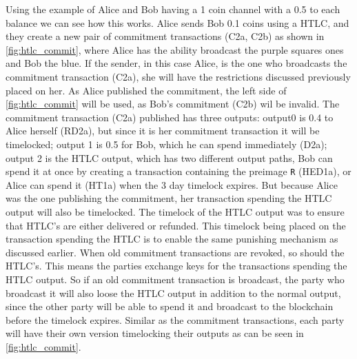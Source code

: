 Using the example of Alice and Bob having a 1 coin channel with a 0.5 to each balance we can see how this works. Alice sends Bob 0.1 coins using a HTLC, and they create a new pair of commitment transactions (C2a, C2b) as shown in \cref{fig:htlc_commit}, where Alice has the ability broadcast the purple squares ones and Bob the blue.
If the sender, in this case Alice, is the one who broadcasts the commitment transaction (C2a), she will have the restrictions discussed previously placed on her.
As Alice published the commitment, the left side of \cref{fig:htlc_commit} will be used, as Bob's commitment (C2b) wil be invalid. The commitment transaction (C2a) published has three outputs: output0 is 0.4 to Alice herself (RD2a), but since it is her commitment transaction it will be timelocked; output 1 is 0.5 for Bob, which he can spend immediately (D2a); output 2 is the HTLC output, which has two different output paths, Bob can spend it at once by creating a transaction containing the preimage {\tt R} (HED1a), or Alice can spend it (HT1a) when the 3 day timelock expires. But because Alice was the one publishing the commitment, her transaction spending the HTLC output will also be timelocked. The timelock of the HTLC output was to ensure that HTLC's are either delivered or refunded. This timelock being placed on the transaction spending the HTLC is to enable the same punishing mechanism as discussed earlier. When old commitment transactions are revoked, so should the HTLC's. This means the parties exchange keys for the transactions spending the HTLC output. 
So if an old commitment transaction is broadcast, the party who broadcast it will also loose the HTLC output in addition to the normal output, since the other party will be able to spend it and broadcast to the blockchain before the timelock expires. Similar as the commitment transactions, each party will have their own version timelocking their outputs as can be seen in \cref{fig:htlc_commit}. 
\\ 


